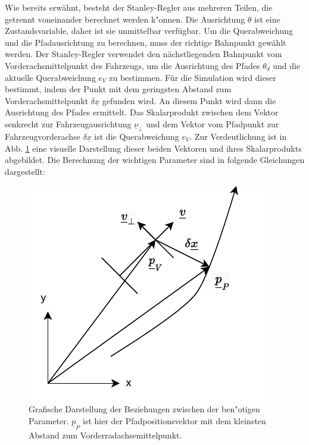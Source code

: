 \documentclass[arbeit=studie,oneside,BCOR=12mm]{ArbeitRST}
\begin{document}
Wie bereits erwähnt, besteht der Stanley-Regler aus mehreren Teilen, die
getrennt voneinander berechnet werden k"onnen. Die Ausrichtung $\theta$ ist eine
Zustandsvariable, daher ist sie unmittelbar verfügbar. Um die Querabweichung und die
Pfadausrichtung zu berechnen, muss der richtige Bahnpunkt gewählt werden. Der
Stanley-Regler verwendet den nächstliegenden Bahnpunkt vom
Vorderachsmittelpunkt des Fahrzeugs, um die Ausrichtung des Pfades $\theta_d$
und die aktuelle Querabweichung $e_{V}$ zu bestimmen. Für die Simulation wird
dieser bestimmt, indem der Punkt mit dem geringsten Abstand zum
Vorderachsmittelpunkt $\delta\underline{x}$ gefunden wird. An diesem Punkt wird
dann die Ausrichtung des Pfades ermittelt. Das Skalarprodukt zwischen dem
Vektor senkrecht zur Fahrzeugausrichtung $\underline{\nu}_{\perp}$ und dem Vektor
vom Pfadpunkt zur Fahrzeugvorderachse $\delta\underline{x}$ ist die
Querabweichung $e_{V}$. Zur Verdeutlichung ist in Abb. \ref{algorithm} eine visuelle
Darstellung dieser beiden Vektoren und ihres Skalarprodukts abgebildet. Die Berechnung
der wichtigen Parameter sind in folgende Gleichungen dargestellt: \\

\begin{figure}[h]
    \centering
    \includegraphics{dot_product}
    \caption{Grafische Darstellung der Beziehungen zwischen der ben"otigen
    Parameter. $\underline{p}_P$ ist hier der Pfadpositionsvektor mit dem
    kleinsten Abstand zum Vorderradachsemittelpunkt.}
    \label{algorithm}
\end{figure}
\end{document}
